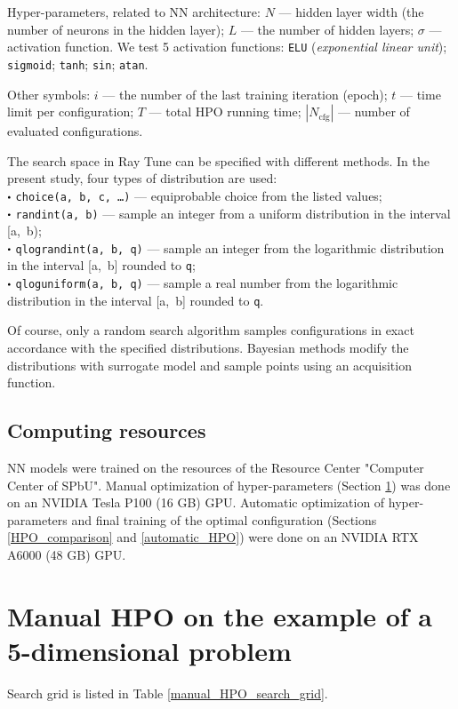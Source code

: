 \documentclass[reprint,
superscriptaddress,
amsmath,amssymb,aps,showkeys,showpacs,
twoside,final,secnumarabic,%
nofootinbib]{revtex4-2}
\newcommand\sbullet[1][.5]{\mathbin{\vcenter{\hbox{\scalebox{#1}{$\bullet$}}}}}
\begin{document}
Hyper-parameters, related to NN architecture: $N$ — hidden layer width (the number of neurons in the hidden layer); $L$ — the number of hidden layers; $\sigma$ — activation function. We test 5 activation functions: \texttt{ELU} (\textit{exponential linear unit}); \texttt{sigmoid}; \texttt{tanh}; \texttt{sin}; \texttt{atan}.

Other symbols: $i$ — the number of the last training iteration (epoch); $t$ — time limit per configuration; $T$ — total HPO running time; $|N_\mathrm{cfg}|$ — number of evaluated configurations.

The search space in Ray Tune can be specified with different methods. In the present study, four types of distribution are used:\\
$\sbullet[0.5]$ \texttt{choice(a,~b,~c,~\ldots)} — equiprobable choice from the listed values;\\
$\sbullet[0.5]$ \texttt{randint(a,~b)} — sample an integer from a uniform distribution in the interval [a,~b);\\
$\sbullet[0.5]$ \texttt{qlograndint(a,~b,~q)} — sample an integer from the logarithmic distribution in the interval [a,~b] rounded to \texttt{q};\\
$\sbullet[0.5]$ \texttt{qloguniform(a,~b,~q)} — sample a real number from the logarithmic distribution in the interval [a,~b] rounded to \texttt{q}.

Of course, only a random search algorithm samples configurations in exact accordance with the specified distributions. Bayesian methods modify the distributions with surrogate model and sample points using an acquisition function.

\subsection{Computing resources}
NN models were trained on the resources of the Resource 
Center "Computer Center of SPbU". Manual optimization of hyper-parameters (Section \ref{manual_HPO}) was done on an NVIDIA Tesla P100 (16 GB) GPU. Automatic optimization of hyper-parameters and final training of the optimal configuration (Sections \ref{HPO_comparison} and \ref{automatic_HPO}) were done on an NVIDIA RTX A6000 (48 GB) GPU.

\section{Manual HPO on the example of a 5-dimensional problem}\label{manual_HPO}
Search grid is listed in Table \ref{manual_HPO_search_grid}.
\end{document}
